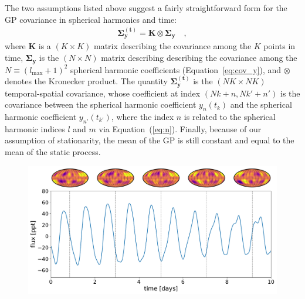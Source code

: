 \documentclass[modern]{aastex62}
\begin{document}
The two assumptions listed above suggest a fairly straightforward form for the
GP covariance in spherical harmonics and time:
%
\begin{align}
    \label{eq:Sigmaty}
    \pmb{\Sigma}_\mathbf{y}^\mathbf{(t)} = \mathbf{K} \otimes \pmb{\Sigma}_\mathbf{y}
    \quad,
\end{align}
%
where $\mathbf{K}$ is a $(K \times K)$ matrix describing the
covariance among the $K$ points in time,
$\pmb{\Sigma}_\mathbf{y}$ is the $(N \times N)$ matrix describing describing
the covariance among the $N \equiv (l_\mathrm{max} + 1)^2$ spherical
harmonic coefficients (Equation~\ref{eq:cov_y}),
and $\otimes$ denotes the Kronecker product.
The quantity $\pmb{\Sigma}_\mathbf{y}^\mathbf{(t)}$
is the $(NK \times NK)$ temporal-spatial covariance, whose coefficient at index
$(Nk + n, Nk' + n')$ is the covariance between the spherical harmonic coefficient
$y_{n}(t_k)$ and the spherical harmonic coefficient $y_{n'}(t_{k'})$, where
the index $n$ is related to the spherical harmonic indices $l$ and $m$ via
Equation~(\ref{eq:n}). Finally, because of our assumption of stationarity,
the mean of the GP is still constant and equal to the mean of the static
process.

\begin{figure}[t!]
    \begin{centering}
        \includegraphics[width=\linewidth]{figures/temporal.pdf}
    \end{centering}
\end{figure}
\end{document}
